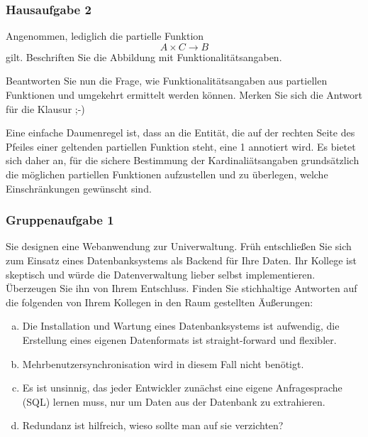 \begin{frame}
    \frametitle{Hausaufgabe 2}
    \vspace{0.5cm}

    Angenommen, lediglich die partielle Funktion
    \[ A \times C \rightarrow B \]
    gilt. 
    Beschriften Sie die Abbildung mit Funktionalitätsangaben.

    Beantworten Sie nun die Frage, wie Funktionalitätsangaben aus partiellen 
    Funktionen und umgekehrt ermittelt werden können. 
    Merken Sie sich die Antwort für die Klausur ;-)
    \pause 

    Eine einfache Daumenregel ist, dass an die Entität, die auf der rechten Seite des 
    Pfeiles einer geltenden partiellen Funktion steht, eine 1 annotiert wird. 
    Es bietet sich daher an, für die sichere Bestimmung der 
    Kardinaliätsangaben grundsätzlich die möglichen partiellen Funktionen aufzustellen und 
    zu überlegen, welche Einschränkungen gewünscht sind.
\end{frame}

\begin{frame}
    \frametitle{Gruppenaufgabe 1}
    \vspace{0.5cm}

    Sie designen eine Webanwendung zur Univerwaltung. 
    Früh entschließen Sie sich zum Einsatz eines Datenbanksystems als 
    Backend für Ihre Daten. 
    Ihr Kollege ist skeptisch und würde die Datenverwaltung lieber selbst implementieren. 
    Überzeugen Sie ihn von Ihrem Entschluss. 
    Finden Sie stichhaltige Antworten auf die folgenden von Ihrem Kollegen in den Raum 
    gestellten Äußerungen:
    \begin{enumerate}[(a)]
        \item Die Installation und Wartung eines Datenbanksystems ist aufwendig, 
        die Erstellung eines eigenen Datenformats ist straight-forward und flexibler.
        \item Mehrbenutzersynchronisation wird in diesem Fall nicht benötigt.
        \item Es ist unsinnig, das jeder Entwickler zunächst eine eigene Anfragesprache (SQL) 
        lernen muss, nur um Daten aus der Datenbank zu extrahieren.
        \item Redundanz ist hilfreich, wieso sollte man auf sie verzichten?
    \end{enumerate}
\end{frame}

